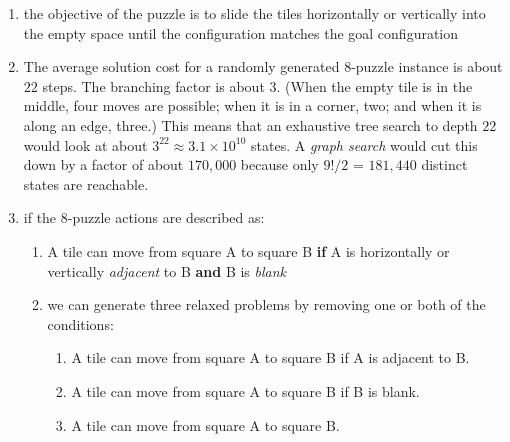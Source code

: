 \begin{enumerate}
    \item the objective of the puzzle is to slide the tiles horizontally or vertically into the empty space until the configuration matches the goal configuration
    \hfill \cite{ai/book/Artificial-Intelligence-A-Modern-Approach/Russell-Norvig}

    \item The average solution cost for a randomly generated 8-puzzle instance is about $22$ steps.
    The branching factor is about $3$.
    (When the empty tile is in the middle, four moves are possible; when it is in a corner, two; and when it is along an edge, three.)
    This means that an exhaustive tree search to depth $22$ would look at about $3^{22} \approx 3.1 \times 10^{10}$ states.
    A \textit{graph search} would cut this down by a factor of about $170,000$ because only $9!/2$ = $181, 440$ distinct states are reachable.
    \hfill \cite{ai/book/Artificial-Intelligence-A-Modern-Approach/Russell-Norvig}

    \item if the 8-puzzle actions are described as:
    \begin{enumerate}
        \item A tile can move from square A to square B \textbf{if} A is horizontally or vertically \textit{adjacent} to B \textbf{and} B is \textit{blank}
        \hfill \cite{ai/book/Artificial-Intelligence-A-Modern-Approach/Russell-Norvig}

        \item we can generate three relaxed problems by removing one or both of the conditions:
        \begin{enumerate}
            \item A tile can move from square A to square B if A is adjacent to B.
            \hfill \cite{ai/book/Artificial-Intelligence-A-Modern-Approach/Russell-Norvig}

            \item A tile can move from square A to square B if B is blank.
            \hfill \cite{ai/book/Artificial-Intelligence-A-Modern-Approach/Russell-Norvig}

            \item A tile can move from square A to square B.
            \hfill \cite{ai/book/Artificial-Intelligence-A-Modern-Approach/Russell-Norvig}
        \end{enumerate}
    \end{enumerate}
\end{enumerate}


